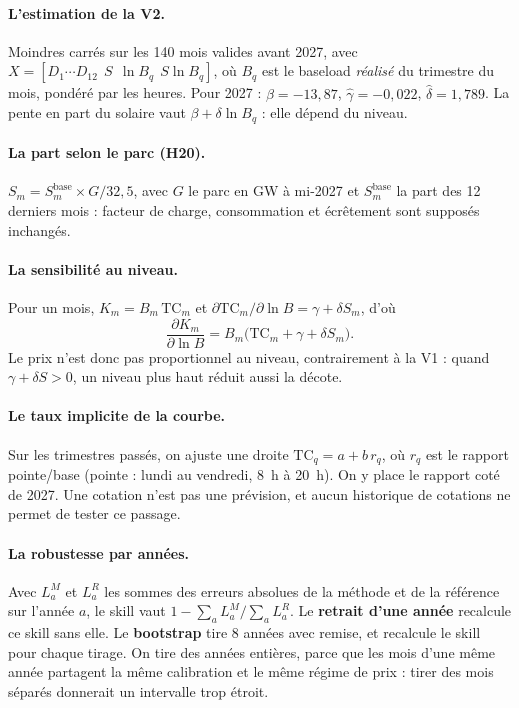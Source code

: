 \documentclass[11pt,a4paper]{article}
\newcommand{\TC}{\mathrm{TC}}
\begin{document}
\paragraph{L'estimation de la V2.} Moindres carrés sur les 140 mois valides avant 2027, avec $X = [D_1 \cdots D_{12}\ \ S\ \ \ln B_q\ \ S \ln B_q]$, où $B_q$ est le baseload \emph{réalisé} du trimestre du mois, pondéré par les heures. Pour 2027 : $\hat\beta = -13{,}87$, $\hat\gamma = -0{,}022$, $\hat\delta = 1{,}789$. La pente en part du solaire vaut $\beta + \delta \ln B_q$ : elle dépend du niveau.

\paragraph{La part selon le parc (H20).} $S_m = S_m^{\text{base}} \times G/32{,}5$, avec $G$ le parc en GW à mi-2027 et $S_m^{\text{base}}$ la part des 12 derniers mois : facteur de charge, consommation et écrêtement sont supposés inchangés.

\paragraph{La sensibilité au niveau.} Pour un mois, $K_m = B_m\,\TC_m$ et $\partial \TC_m / \partial \ln B = \gamma + \delta S_m$, d'où
\[
\frac{\partial K_m}{\partial \ln B} = B_m\big(\TC_m + \gamma + \delta S_m\big).
\]
Le prix n'est donc pas proportionnel au niveau, contrairement à la V1 : quand $\gamma + \delta S > 0$, un niveau plus haut réduit aussi la décote.

\paragraph{Le taux implicite de la courbe.} Sur les trimestres passés, on ajuste une droite $\TC_q = a + b\,r_q$, où $r_q$ est le rapport pointe/base (pointe : lundi au vendredi, 8~h à 20~h). On y place le rapport coté de 2027. Une cotation n'est pas une prévision, et aucun historique de cotations ne permet de tester ce passage.

\paragraph{La robustesse par années.} Avec $L^M_a$ et $L^R_a$ les sommes des erreurs absolues de la méthode et de la référence sur l'année $a$, le skill vaut $1 - \sum_a L^M_a / \sum_a L^R_a$. Le \textbf{retrait d'une année} recalcule ce skill sans elle. Le \textbf{bootstrap} tire 8 années avec remise, et recalcule le skill pour chaque tirage. On tire des années entières, parce que les mois d'une même année partagent la même calibration et le même régime de prix : tirer des mois séparés donnerait un intervalle trop étroit.
\end{document}
